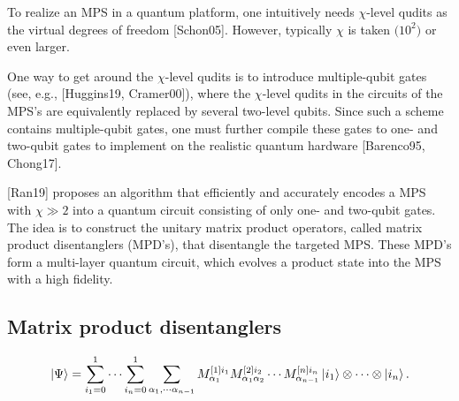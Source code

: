 \documentclass[11pt, oneside]{article}   	%
\begin{document}
To realize an MPS in a quantum platform, one intuitively needs $\chi$-level qudits as the virtual degrees of freedom [Schon05]. 
However, typically $\chi$ is taken $\mathcal(10^2)$ or even larger.

One way to get around the $\chi$-level qudits is to introduce multiple-qubit gates (see, e.g., [Huggins19, Cramer00]), 
where the  $\chi$-level qudits in the circuits of the MPS’s are equivalently replaced by several two-level qubits. 
Since such a scheme contains multiple-qubit gates, one must further compile these gates to one- and two-qubit gates to implement on the realistic quantum hardware [Barenco95, Chong17].

[Ran19] proposes an algorithm that efficiently and accurately encodes a MPS with $\chi \gg 2$ into a quantum circuit consisting of only one- and two-qubit gates. 
The idea is to construct the unitary matrix product operators, called matrix product disentanglers (MPD’s), that disentangle the targeted MPS. 
These MPD’s form a multi-layer quantum circuit, which evolves a product state into the MPS with a high fidelity.

\subsection{Matrix product disentanglers}
\begin{equation}
\ket{\Psi} 
= \sum^1_{i_1 = 0} \cdots \sum^1_{i_n = 0} 
\sum_{\alpha_1, \cdots \alpha_{n-1}} M^{[1] i_1}_{\alpha_1} M^{[2] i_2}_{\alpha_1 \alpha_2} \cdots M^{[n] i_n}_{\alpha_{n-1}}
\ket{i_1} \otimes \cdots \otimes \ket{i_n}.
\end{equation}
\end{document}
